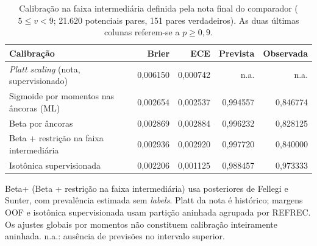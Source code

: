 \begin{table}[!ht]
\centering
\footnotesize
\caption{Calibração na faixa intermediária definida pela nota final do comparador ($5\leq v<9$; 21.620 potenciais pares, 151 pares verdadeiros). As duas últimas colunas referem-se a $p\geq0{,}9$.}
\label{tab:cap8-ancoras-beta}
\begin{tabular}{lrrrr}
\toprule
Calibração & Brier & ECE & Prevista & Observada \\
\midrule
\textit{Platt scaling} (nota, supervisionado) & 0,006150 & 0,000742 & n.a. & n.a. \\
Sigmoide por momentos nas âncoras (ML) & 0,002654 & 0,002537 & 0,994557 & 0,846774 \\
Beta por âncoras & 0,002869 & 0,002884 & 0,996232 & 0,828125 \\
Beta + restrição na faixa intermediária & 0,002936 & 0,002920 & 0,997720 & 0,840000 \\
Isotônica supervisionada & 0,002206 & 0,001125 & 0,988457 & 0,973333 \\
\bottomrule
\end{tabular}
\par\smallskip
\parbox{\linewidth}{\footnotesize Beta+ (Beta + restrição na faixa intermediária) usa posteriores de Fellegi e Sunter, com prevalência estimada sem \textit{labels}. Platt da nota é histórico; margens OOF e isotônica supervisionada usam partição aninhada agrupada por REFREC. Os ajustes globais por momentos não constituem calibração inteiramente aninhada. n.a.: ausência de previsões no intervalo superior.}
\end{table}
